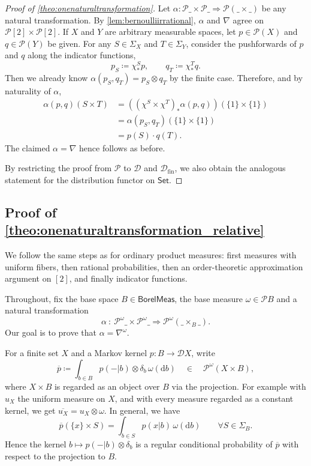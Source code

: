 \documentclass[11pt,a4paper]{scrartcl}
\newcommand{\setc}{\mathsf{Set}}
\newcommand{\borelmeas}{\mathsf{BorelMeas}}
\newcommand{\dx}{\mathrm{d}}
\newcommand{\finiteset}[1]{[#1]}	%
\newcommand{\two}{\finiteset{2}}		%
\newcommand{\dist}{\mathcal{D}}
\newcommand{\distfin}{\mathcal{D}_{\mathrm{fin}}}
\newcommand{\giry}{\mathcal{P}}
\theoremstyle{definition}
\begin{document}
\begin{proof}[Proof of \cref{theo:onenaturaltransformation}]
	Let $\alpha : \giry\_ \times \giry\_ \Rightarrow \giry(\_ \times \_)$ be any natural transformation.
	By \cref{lem:bernoulliirrational}, $\alpha$ and $\nabla$ agree on $\giry\two \times \giry\two$.
  If $X$ and $Y$ are arbitrary measurable spaces, let $p \in \giry(X)$ and $q \in \giry(Y)$ be given.
  For any $S \in \Sigma_X$ and $T \in \Sigma_Y$, consider the pushforwards of $p$ and $q$ along the indicator functions,
	\[
		p_S \coloneq \chi^S_\ast p, \qquad q_T \coloneq \chi^T_\ast q.
	\]
	Then we already know $\alpha(p_S,q_T) = p_S \otimes q_T$ by the finite case.
	Therefore, and by naturality of $\alpha$,
	\begin{align*}
		\alpha(p,q)(S \times T) & = ((\chi^S \times \chi^T)_\ast\alpha(p,q))(\{1\} \times \{1\}) \\[2pt]
																		& = \alpha(p_S,q_T)(\{1\} \times \{1\}) \\[2pt]
																	& = p(S) \cdot q(T).
	\end{align*}
	The claimed $\alpha = \nabla$ hence follows as before.

	By restricting the proof from $\giry$ to $\dist$ and $\distfin$, we also obtain the analogous statement for the distribution functor on $\setc$.
\end{proof}

\subsection{Proof of \cref{theo:onenaturaltransformation_relative}}

We follow the same steps as for ordinary product measures: first measures with uniform fibers, then rational probabilities,
then an order-theoretic approximation argument on $\two$, and finally indicator functions.

Throughout, fix the base space $B \in \borelmeas$, the base measure $\omega \in \giry B$ and a natural transformation
\[
	\alpha \: : \: \giry^\omega\_ \times \giry^\omega\_ \Longrightarrow \giry^\omega(\_ \times_B \_).
\]
Our goal is to prove that $\alpha = \nabla^\omega$.

For a finite set $X$ and a Markov kernel $p : B \to \dist X$, write
\[
	\overline{p} \coloneq \int_{b \in B} p(-|b) \otimes \delta_b \, \omega(\dx b)
	\quad\in\quad \giry^\omega(X \times B),
\]
where $X \times B$ is regarded as an object over $B$ via the projection.
For example with $u_X$ the uniform measure on $X$, and with every measure regarded as a constant kernel, 
we get $\overline{u_X} = u_X \otimes \omega$.
In general, we have
\[
	\overline{p}(\{x\} \times S) = \int_{b \in S} p(x|b)\,\omega(\dx b) \qquad \forall S \in \Sigma_B.
\]
Hence the kernel $b \mapsto p(-|b) \otimes \delta_b$ is a regular conditional probability of $\overline{p}$ with respect to the projection to $B$.
\end{document}
